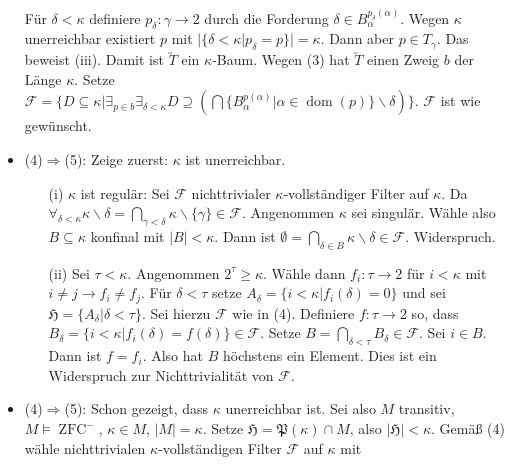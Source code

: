 \documentclass[a4paper,fontsize=11pt]{scrartcl}
\newcommand{\ZFC}{\operatorname{ZFC}}
\newcommand{\dom}{\operatorname{dom}}
\begin{document}
\begin{itemize}
      Für $\delta<\kappa$ definiere $p_\delta:\gamma\rightarrow 2$
      durch die Forderung $\delta\in
      B_\alpha^{p_\delta(\alpha)}$. Wegen $\kappa$ unerreichbar
      existiert $p$ mit $|\{\delta<\kappa|p_\delta=p\}|=\kappa$. Dann
      aber $p\in T_\gamma$. Das beweist (iii). Damit ist $\utilde{T}$
      ein $\kappa$-Baum. \newline Wegen (3) hat $\utilde{T}$ einen
      Zweig $b$ der Länge $\kappa$. Setze
      $\mathcal{F}=\{D\subseteq\kappa|\exists_{p\in
        b}\exists_{\delta<\kappa}
      D\supseteq(\bigcap\{B_\alpha^{p(\alpha)}|
      \alpha\in\dom(p)\}\backslash\delta)\}$. $\mathcal{F}$ ist wie
      gewünscht.
    \item (4)$\Rightarrow$(5): Zeige zuerst: $\kappa$ ist
      unerreichbar.
      \begin{itemize}
      \item[(i)] $\kappa$ ist regulär: Sei $\mathcal{F}$
        nichttrivialer $\kappa$-vollständiger Filter auf $\kappa$. Da
        $\forall_{\delta<\kappa}\kappa\backslash\delta=
        \bigcap\limits_{\gamma<\delta}\kappa\backslash
        \{\gamma\}\in\mathcal{F}$. Angenommen $\kappa$ sei
        singulär. Wähle also $B\subseteq\kappa$ konfinal mit
        $|B|<\kappa$. Dann ist $\emptyset=\bigcap\limits_{\delta\in
          B}\kappa\backslash\delta\in\mathcal{F}$. Widerspruch.
      \item[(ii)] Sei $\tau<\kappa$. Angenommen
        $2^\tau\ge\kappa$. Wähle dann $f_i:\tau\rightarrow 2$ für
        $i<\kappa$ mit $i\neq j\rightarrow f_i\neq f_j$. Für
        $\delta<\tau$ setze $A_\delta=\{i<\kappa|f_i(\delta)=0\}$ und
        sei $\mathfrak{H}=\{A_\delta|\delta<\tau\}$. Sei hierzu
        $\mathcal{F}$ wie in (4). Definiere $f:\tau\rightarrow 2$ so,
        dass
        $B_\delta=\{i<\kappa|f_i(\delta)=f(\delta)\}\in\mathcal{F}$. Setze
        $B=\bigcap\limits_{\delta<\tau}B_\delta\in\mathcal{F}$. Sei
        $i\in B$. Dann ist $f=f_i$. Also hat $B$ höchstens ein
        Element. Dies ist ein Widerspruch zur Nichttrivialität von
        $\mathcal{F}$.
      \end{itemize}
    \item (4)$\Rightarrow$(5): Schon gezeigt, dass $\kappa$
      unerreichbar ist. Sei also $M$ transitiv, $M\models\ZFC^-$,
      $\kappa\in M$, $|M|=\kappa$. Setze
      $\mathfrak{H}=\mathfrak{P}(\kappa)\cap M$, also
      $|\mathfrak{H}|<\kappa$. Gemäß (4) wähle nichttrivialen
      $\kappa$-vollständigen Filter $\mathcal{F}$ auf $\kappa$ mit
      \begin{itemize}

\end{itemize}
\end{itemize}
\end{document}
